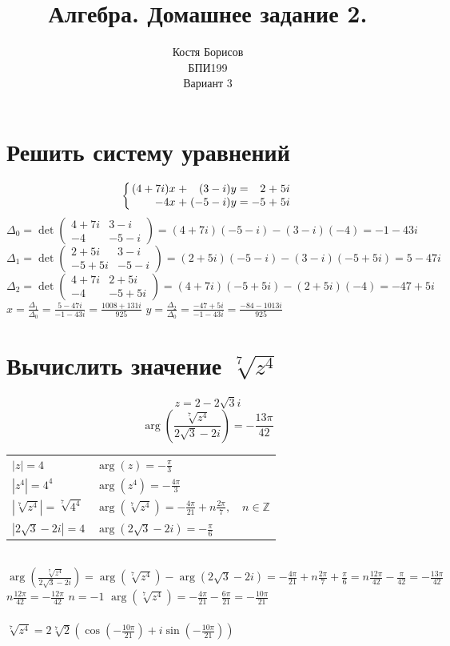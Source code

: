 \documentclass{article}
\title{Алгебра. Домашнее задание 2.}
\author{Костя Борисов \\ БПИ199 \\ Вариант 3}
\newcommand{\ds}{\displaystyle}
\newcommand{\abs}[1]{\left|#1\right|}
\newcommand{\Arg}[1]{\arg\left(#1\right)}
\newcommand{\TrigFrom}[1]{
  \left(\cos\left({#1}\right)+i\sin\left({#1}\right)\right)
}
\begin{document}
  \maketitle

  \section{Решить систему уравнений}
  \[
    \left\{
      \arraycolsep=1.4pt
      \begin{array}{rrrrrrr}
        (4+7i)x &+& (3-i)y &=& 2&+&5i \\
        -4x &+& (-5-i)y &=& -5&+&5i
      \end{array}
    \right.
  \]
  $\ds \Delta_0 = \det\begin{pmatrix}
    4+7i & 3-i \\
    -4 & -5-i
  \end{pmatrix} = (4+7i)(-5-i)-(3-i)(-4) = -1-43i$
  \\
  $\ds \Delta_1 = \det\begin{pmatrix}
    2+5i & 3-i \\
    -5+5i & -5-i
  \end{pmatrix} = (2+5i)(-5-i)-(3-i)(-5+5i) = 5-47i$
  \\
  $\ds \Delta_2 = \det\begin{pmatrix}
    4+7i & 2+5i \\
    -4 & -5+5i
  \end{pmatrix} = (4+7i)(-5+5i)-(2+5i)(-4) = -47+5i$
  \\
  $\ds x = \frac{\Delta_1}{\Delta_0} = \frac{5-47i}{-1-43i} = \frac{1008 + 131i}{925}$ \quad
  $\ds y = \frac{\Delta_2}{\Delta_0} = \frac{-47+5i}{-1-43i} = \frac{-84 - 1013i}{925}$

  \section{Вычислить значение $\sqrt[7]{z^4}$}
  $$ z = 2 - 2\sqrt{3}i $$
  $$ \Arg{ \frac{\sqrt[7]{z^4}}{2\sqrt{3} - 2i} } = -\frac{13\pi}{42} $$
  \begin{tabular}{ll}
    $\ds \abs{z} = 4$ & $\ds \Arg z = -\frac{\pi}{3}$ \\
    $\ds \abs{z^4} = 4^4$ & $\ds \Arg{z^4} = -\frac{4\pi}{3}$ \\
    $\ds \abs{\sqrt[7]{z^4}} = \sqrt[7]{4^4}$ & $\ds \Arg{\sqrt[7]{z^4}} = -\frac{4\pi}{21} + n\frac{2\pi}{7},\quad n\in\mathbb{Z}$ \\
    $\ds \abs{2\sqrt{3} - 2i} = 4$ & $\ds \Arg{2\sqrt{3} - 2i} = -\frac{\pi}{6}$
  \end{tabular} \\
  $\ds \Arg{ \frac{\sqrt[7]{z^4}}{2\sqrt{3} - 2i} }
    = \Arg{\sqrt[7]{z^4}} - \Arg{2\sqrt{3} - 2i}
    = -\frac{4\pi}{21} + n\frac{2\pi}{7} + \frac{\pi}{6}
    = n\frac{12\pi}{42} - \frac{\pi}{42}
    = -\frac{13\pi}{42}
  $ \\
  $\ds n\frac{12\pi}{42} = -\frac{12\pi}{42}$ \quad $n = -1$ \quad
  $\ds \Arg{\sqrt[7]{z^4}} = -\frac{4\pi}{21} - \frac{6\pi}{21} = -\frac{10\pi}{21}$ \\ \\
  $\ds \sqrt[7]{z^4} = 2\sqrt[7]{2} \TrigFrom{-\frac{10\pi}{21}}$
\end{document}
